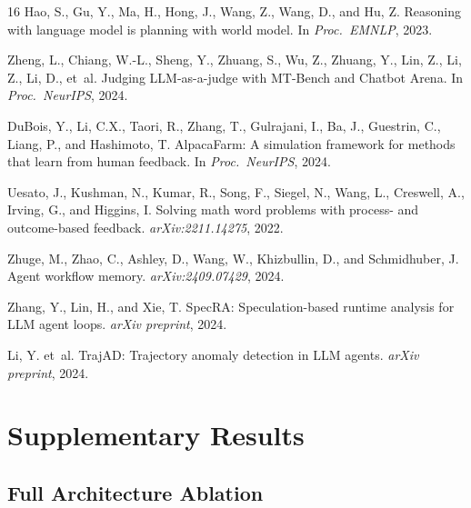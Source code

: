 \documentclass[11pt,a4paper]{article}
\begin{document}
\begin{thebibliography}{16}
Hao, S., Gu, Y., Ma, H., Hong, J., Wang, Z., Wang, D., and Hu, Z.
\newblock Reasoning with language model is planning with world model.
\newblock In \emph{Proc.\ EMNLP}, 2023.

Zheng, L., Chiang, W.-L., Sheng, Y., Zhuang, S., Wu, Z., Zhuang, Y., Lin, Z., Li, Z., Li, D., et~al.
\newblock Judging LLM-as-a-judge with MT-Bench and Chatbot Arena.
\newblock In \emph{Proc.\ NeurIPS}, 2024.

DuBois, Y., Li, C.X., Taori, R., Zhang, T., Gulrajani, I., Ba, J., Guestrin, C., Liang, P., and Hashimoto, T.
\newblock AlpacaFarm: A simulation framework for methods that learn from human feedback.
\newblock In \emph{Proc.\ NeurIPS}, 2024.

Uesato, J., Kushman, N., Kumar, R., Song, F., Siegel, N., Wang, L., Creswell, A., Irving, G., and Higgins, I.
\newblock Solving math word problems with process- and outcome-based feedback.
\newblock \emph{arXiv:2211.14275}, 2022.

Zhuge, M., Zhao, C., Ashley, D., Wang, W., Khizbullin, D., and Schmidhuber, J.
\newblock Agent workflow memory.
\newblock \emph{arXiv:2409.07429}, 2024.

Zhang, Y., Lin, H., and Xie, T.
\newblock SpecRA: Speculation-based runtime analysis for LLM agent loops.
\newblock \emph{arXiv preprint}, 2024.

Li, Y. et~al.
\newblock TrajAD: Trajectory anomaly detection in LLM agents.
\newblock \emph{arXiv preprint}, 2024.

\end{thebibliography}

\appendix
\section{Supplementary Results}

\subsection{Full Architecture Ablation}
\label{app:arch}
\end{document}
